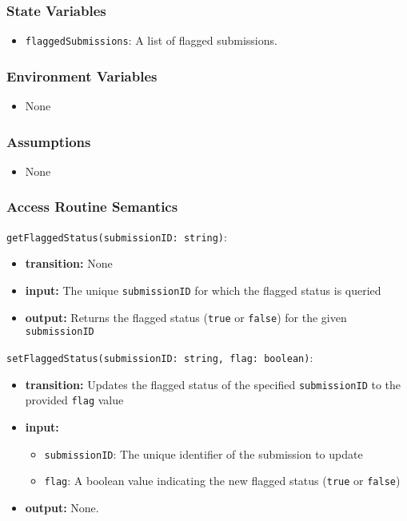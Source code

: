 \documentclass[12pt, titlepage]{article}
\begin{document}
\subsubsection{State Variables}

\begin{itemize}
    \item \texttt{flaggedSubmissions}: A list of flagged submissions.
\end{itemize}

\subsubsection{Environment Variables}

\begin{itemize}
  \item None
\end{itemize}

\subsubsection{Assumptions}

\begin{itemize}
    \item None
\end{itemize}

\subsubsection{Access Routine Semantics}

\noindent \texttt{getFlaggedStatus(submissionID: string)}:
\begin{itemize}
    \item \textbf{transition:} None
    \item \textbf{input:} The unique \texttt{submissionID} for which the flagged status is queried
    \item \textbf{output:} Returns the flagged status (\texttt{true} or \texttt{false}) for the given \texttt{submissionID}
\end{itemize}

\noindent \texttt{setFlaggedStatus(submissionID: string, flag: boolean)}:
\begin{itemize}
    \item \textbf{transition:} Updates the flagged status of the specified \texttt{submissionID} to the provided \texttt{flag} value
    \item \textbf{input:} 
    \begin{itemize}
        \item \texttt{submissionID}: The unique identifier of the submission to update
        \item \texttt{flag}: A boolean value indicating the new flagged status (\texttt{true} or \texttt{false})
    \end{itemize}
    \item \textbf{output:} None.
\end{itemize}
\end{document}
